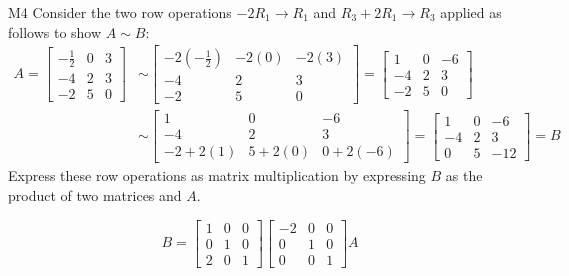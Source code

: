 \begin{problem}{M4}
Consider the two row operations 
\(-2R_1\to R_1\) and \(R_3+2R_1\to R_3\)
applied as follows to show \(A\sim B\):
\begin{align*}
A
  =
\begin{bmatrix}
-\frac{1}{2}&0&3\\
-4&2&3\\
-2&5&0
\end{bmatrix}
  &\sim
\begin{bmatrix}
-2(-\frac{1}{2})&-2(0)&-2(3)\\
-4&2&3\\
-2&5&0
\end{bmatrix}
  =
\begin{bmatrix}
1&0&-6\\
-4&2&3\\
-2&5&0
\end{bmatrix}
  \\&\sim
\begin{bmatrix}
1&0&-6\\
-4&2&3\\
-2+2(1)&5+2(0)&0+2(-6)
\end{bmatrix}
  =
\begin{bmatrix}
1&0&-6\\
-4&2&3\\
0&5&-12
\end{bmatrix}
  = 
B
\end{align*}
Express these row operations as matrix multiplication
by expressing \(B\) as the product of two matrices and \(A\).
\end{problem}
\begin{solution}
\[
B
  =
\begin{bmatrix}
  1&0&0\\
  0&1&0\\
  2&0&1
\end{bmatrix}
\begin{bmatrix}
  -2&0&0\\
  0&1&0\\
  0&0&1
\end{bmatrix}
A
\]
\end{solution}


